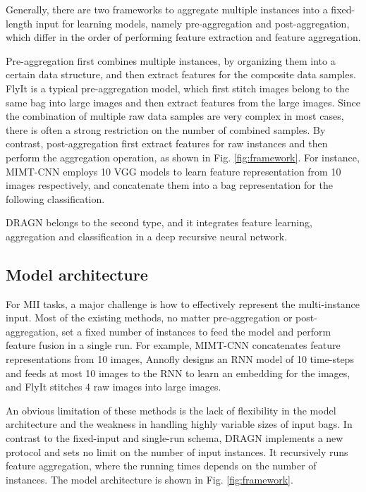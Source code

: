 \documentclass[10pt,twocolumn,letterpaper]{article}
\begin{document}
Generally, there are two frameworks to aggregate multiple instances into a fixed-length input for learning models, namely pre-aggregation and post-aggregation, which differ in the order of performing feature extraction and feature aggregation.

Pre-aggregation first combines multiple instances, by organizing them into a certain data structure, and then extract features for the composite data samples. FlyIt \cite{ref27} is a typical pre-aggregation model, which first stitch images belong to the same bag into large images and then extract features from the large images. Since the combination of multiple raw data samples are very complex in most cases, there is often a strong restriction on the number of combined samples. By contrast,  post-aggregation first extract features for raw instances and then perform the aggregation operation, as shown in Fig. \ref{fig:framework}. For instance, MIMT-CNN \cite{MIMT-CNN} employs 10 VGG models to learn feature representation from 10 images respectively, and concatenate them into a bag representation for the following classification. 
 
DRAGN belongs to the second type, and it integrates feature learning, aggregation and classification in a deep recursive neural network.

\subsection{Model architecture}\label{sec:model}
For MII tasks, a major challenge is how to effectively represent the multi-instance input. Most of the existing methods, no matter pre-aggregation or post-aggregation, set a fixed number of instances to feed the model and perform feature fusion in a single run. 
For example, MIMT-CNN concatenates feature representations from 10 images, Annofly designs an RNN model of 10 time-steps and feeds at most 10 images to the RNN to learn an embedding for the images, and FlyIt stitches 4 raw images into large images. 

An obvious limitation of these methods is the lack of flexibility in the model architecture and the weakness in handling highly variable sizes of input bags. In contrast to the fixed-input and single-run schema, DRAGN implements a new protocol and sets no limit on the number of input instances. It recursively runs feature aggregation, where the running times depends on the number of instances. The model architecture is shown in Fig. \ref{fig:framework}.
\end{document}
